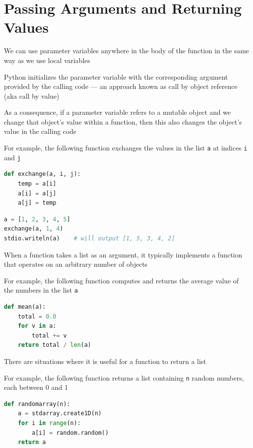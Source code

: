 \documentclass[8pt,a4paper,compress]{beamer}
\begin{document}
\section{Passing Arguments and Returning Values}
\begin{frame}[fragile]
\pause

We can use parameter variables anywhere in the body of the function in the same way as we use local variables

\pause
\bigskip

Python initializes the parameter variable with the corresponding argument provided by the calling code --- an approach known as call by object reference (aka call by value)

\pause
\bigskip

As a consequence, if a parameter variable refers to a mutable object and we change that object's value within a function, then this also changes the object's value in the calling code

\pause
\bigskip

For example, the following function exchanges the values in the list \lstinline{a} at indices \lstinline{i} and \lstinline{j}
\begin{lstlisting}[language=Python]
def exchange(a, i, j):
    temp = a[i]
    a[i] = a[j]
    a[j] = temp
\end{lstlisting}

\begin{lstlisting}[language=Python]
a = [1, 2, 3, 4, 5]
exchange(a, 1, 4) 
stdio.writeln(a)    # will output [1, 5, 3, 4, 2]
\end{lstlisting}
\end{frame}

\begin{frame}[fragile]
\pause

When a function takes a list as an argument, it typically implements a function that operates on an arbitrary number of objects

\pause
\bigskip

For example, the following function computes and returns the average value of the numbers in the list \lstinline{a}
\begin{lstlisting}[language=Python]
def mean(a):
    total = 0.0
    for v in a:
        total += v
    return total / len(a)
\end{lstlisting}

\pause
\bigskip

There are situations where it is useful for a function to return a list

\pause
\bigskip

For example, the following function returns a list containing \lstinline{n} random numbers, each between 0 and 1
\begin{lstlisting}[language=Python]
def randomarray(n):
    a = stdarray.create1D(n)
    for i in range(n):
        a[i] = random.random()
    return a
\end{lstlisting}
\end{frame}
\end{document}
